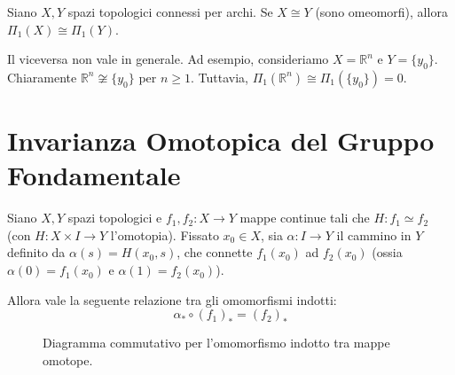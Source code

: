 \begin{coro}
Siano $X, Y$ spazi topologici connessi per archi. Se $X \cong Y$ (sono omeomorfi), allora $\Pi_1(X) \cong \Pi_1(Y)$.
\end{coro}

\begin{observacion}
Il viceversa non vale in generale. Ad esempio, consideriamo $X = \mathbb{R}^n$ e $Y = \{y_0\}$. Chiaramente $\mathbb{R}^n \not\cong \{y_0\}$ per $n \geqslant 1$. Tuttavia, $\Pi_1(\mathbb{R}^n) \cong \Pi_1(\{y_0\}) = 0$.
\end{observacion}

\vspace{2em}

\section{Invarianza Omotopica del Gruppo Fondamentale}

\begin{lema}
Siano $X, Y$ spazi topologici e $f_1, f_2: X \to Y$ mappe continue tali che $H: f_1 \simeq f_2$ (con $H: X \times I \to Y$ l'omotopia).
Fissato $x_0 \in X$, sia $\alpha: I \to Y$ il cammino in $Y$ definito da $\alpha(s) = H(x_0, s)$, che connette $f_1(x_0)$ ad $f_2(x_0)$ (ossia $\alpha(0) = f_1(x_0)$ e $\alpha(1) = f_2(x_0)$).

Allora vale la seguente relazione tra gli omomorfismi indotti:
\[
\alpha_* \circ (f_1)_* = (f_2)_*
\]

\begin{figure}[H]
    \centering
    \caption{Diagramma commutativo per l'omomorfismo indotto tra mappe omotope.}
\end{figure}
\end{lema}

